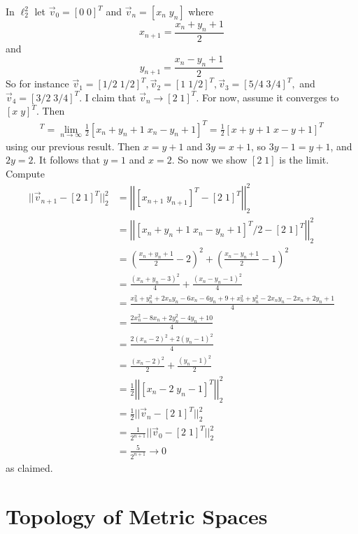 \begin{example}
    In $\ell_2^2$ let $\vec{v}_0 = [0\;0]^T$ and $\vec{v}_n = [x_n\;y_n]$ where $$x_{n+1} = \frac{x_n+y_n+1}{2}$$ and $$y_{n+1} = \frac{x_n - y_n+1}{2}$$ So for instance $\vec{v}_1 = [1/2\;1/2]^T,\vec{v}_2 = [1\;1/2]^T,\vec{v}_3 = [5/4\;3/4]^T,$ and $\vec{v}_4 = [3/2\;3/4]^T$. I claim that $\vec{v}_n\rightarrow [2\;1]^T$. For now, assume it converges to $[x\;y]^T$. Then \begin{align*}
        [x\;y]^T = \lim\limits_{n\rightarrow \infty}\frac{1}{2}[x_n+y_n+1\;x_n-y_n+1]^T = \frac{1}{2}[x+y+1\;x-y+1]^T
    \end{align*}
    using our previous result. Then $x = y+1$ and $3y = x+1$, so $3y-1=y+1$, and $2y = 2$. It follows that $y = 1$ and $x = 2$. So now we show $[2\;1]$ is the limit. Compute \begin{align*}
        ||\vec{v}_{n+1} - [2\;1]^T||_2^2 &= \left|\left|[x_{n+1}\;y_{n+1}]^T - [2\;1]^T\right|\right|_2^2 \\
        &= \left|\left|[x_{n}+y_n+1\;x_n -y_{n}+1]^T/2 - [2\;1]^T\right|\right|_2^2 \\
        &= \left(\frac{x_n+y_n+1}{2}-2\right)^2 + \left(\frac{x_n-y_n+1}{2}-1\right)^2 \\
        &=\frac{(x_n+y_n-3)^2}{4} + \frac{(x_n-y_n-1)^2}{4} \\
        &= \frac{x_n^2+y_n^2+2x_ny_n-6x_n-6y_n+9+x_n^2+y_n^2-2x_ny_n-2x_n+2y_n+1}{4} \\
        &= \frac{2x_n^2-8x_n+2y_n^2-4y_n+10}{4} \\
        &= \frac{2(x_n-2)^2+2(y_n-1)^2}{4} \\
        &= \frac{(x_n-2)^2}{2} + \frac{(y_n-1)^2}{2} \\
        &= \frac{1}{2}\left|\left|[x_n-2\;y_n-1]^T\right|\right|_2^2 \\
        &= \frac{1}{2}||\vec{v}_n - [2\;1]^T||_2^2 \tag{iterate this argument} \\
        &= \frac{1}{2^{n+1}}||\vec{v}_0 - [2\;1]^T||_2^2 \\
        &=\frac{5}{2^{n+1}}\rightarrow 0
    \end{align*}
    as claimed.
\end{example}


\section{Topology of Metric Spaces}

